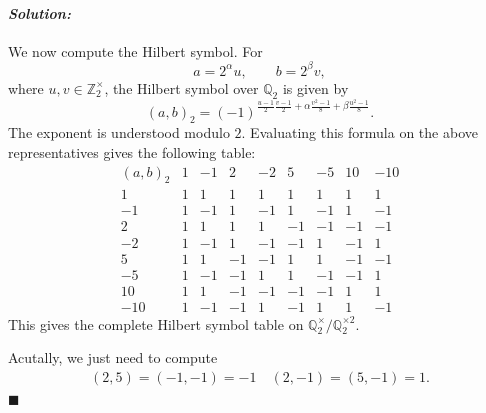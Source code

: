 \documentclass[12pt, a4paper]{article}
\newenvironment{solution}
  {\paragraph{\textit{Solution:}}\par\medskip}
  {\hfill$\blacksquare$\vspace{0.1cm}}
\begin{document}
\begin{solution}
We now compute the Hilbert symbol. For
\[
a=2^\alpha u,\qquad b=2^\beta v,
\]
where \(u,v\in\mathbb Z_2^\times\), the Hilbert symbol over \(\mathbb Q_2\) is
given by
\[
(a,b)_2
=
(-1)^{
\frac{u-1}{2}\frac{v-1}{2}
+\alpha\frac{v^2-1}{8}
+\beta\frac{u^2-1}{8}
}.
\]
The exponent is understood modulo \(2\). Evaluating this formula on the above
representatives gives the following table:
\[
\begin{array}{c|rrrrrrrr}
(a,b)_2
& 1 & -1 & 2 & -2 & 5 & -5 & 10 & -10\\
\hline
1
& 1 & 1 & 1 & 1 & 1 & 1 & 1 & 1\\
-1
& 1 & -1 & 1 & -1 & 1 & -1 & 1 & -1\\
2
& 1 & 1 & 1 & 1 & -1 & -1 & -1 & -1\\
-2
& 1 & -1 & 1 & -1 & -1 & 1 & -1 & 1\\
5
& 1 & 1 & -1 & -1 & 1 & 1 & -1 & -1\\
-5
& 1 & -1 & -1 & 1 & 1 & -1 & -1 & 1\\
10
& 1 & 1 & -1 & -1 & -1 & -1 & 1 & 1\\
-10
& 1 & -1 & -1 & 1 & -1 & 1 & 1 & -1
\end{array}
\]
This gives the complete Hilbert symbol table on
\(\mathbb Q_2^\times/\mathbb Q_2^{\times 2}\).

Acutally, we just need to compute 
\begin{align*}
    (2,5) = (-1,-1) = -1\quad (2,-1)=(5,-1) = 1.
\end{align*}
\end{solution}
\end{document}
